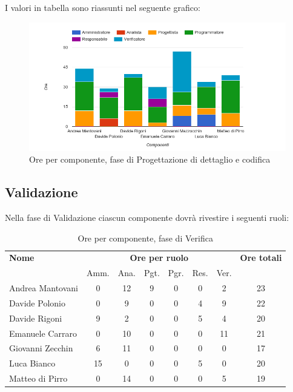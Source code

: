 I valori in tabella sono riassunti nel seguente grafico: \\ 

    \begin{figure}[H]
      \begin{center}
        \includegraphics[width=12cm]{res/img/orePerComponenteProgettazioneDettaglioCodifica.png}
      \caption{Ore per componente, fase di Progettazione di dettaglio e codifica}
      \end{center} 
    \end{figure}    
    
    
    
\pagebreak
\subsection{Validazione}
Nella fase di Validazione ciascun componente dovrà rivestire i seguenti ruoli:

\begin{table}[H]
\begin{tabular}{lccccccc}
\toprule
    \textbf{Nome}  & \multicolumn{6}{c}{\textbf{Ore per ruolo}} & \textbf{Ore totali} \\
     & Amm. & Ana. & Pgt. & Pgr. & Res. & Ver. & \\
    \midrule
    
	Andrea Mantovani & 0 & 12 & 9 & 0 & 0 & 2 & 23 \\
	Davide Polonio & 0 & 9 & 0 & 0 & 4 & 9 & 22 \\
	Davide Rigoni & 9 & 2 & 0 & 0 & 5 & 4 & 20 \\
	Emanuele Carraro & 0 & 10 & 0 & 0 & 0 & 11 & 21 \\
	Giovanni Zecchin & 6 & 11 & 0 & 0 & 0 & 0 & 17 \\
	Luca Bianco & 15 & 0 & 0 & 0 & 5 & 0 & 20 \\
	Matteo di Pirro & 0 & 14 & 0 & 0 & 0 & 5 & 19 \\
    
    \bottomrule
\end{tabular}
\caption{Ore per componente, fase di Verifica}
\end{table}

